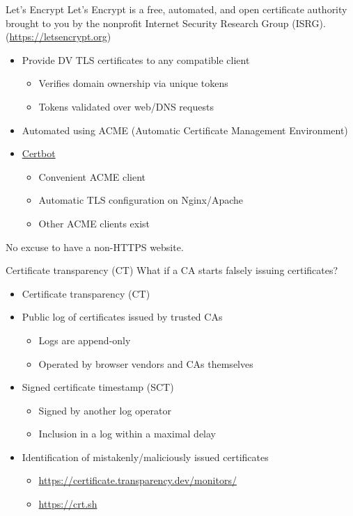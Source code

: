 \begin{frame}{Let's Encrypt}
  \pause
  Let's Encrypt is a free, automated, and open certificate authority brought to you by the nonprofit Internet Security Research Group (ISRG). ({\scriptsize\url{https://letsencrypt.org}})
  \begin{itemize}[<+(1)->]
    \item Provide DV TLS certificates to any compatible client
    \begin{itemize}
      \item Verifies domain ownership via unique tokens
      \item Tokens validated over web/DNS requests
    \end{itemize}
    \item Automated using ACME (Automatic Certificate Management Environment)
    \item \href{https://certbot.eff.org}{Certbot}
    \begin{itemize}
      \item Convenient ACME client
      \item Automatic TLS configuration on Nginx/Apache
      \item Other ACME clients exist
    \end{itemize}
  \end{itemize}

  \pause
  No excuse to have a non-HTTPS website.
\end{frame}

\begin{frame}{Certificate transparency (CT)}
  What if a CA starts falsely issuing certificates?
  \begin{itemize}[<+(1)->]
    \item Certificate transparency (CT)
    \item Public log of certificates issued by trusted CAs
    \begin{itemize}
      \item Logs are append-only
      \item Operated by browser vendors and CAs themselves
    \end{itemize}
    \item Signed certificate timestamp (SCT)
    \begin{itemize}
      \item Signed by another log operator
      \item Inclusion in a log within a maximal delay
    \end{itemize}
    \item Identification of mistakenly/maliciously issued certificates
    \begin{itemize}
      \item {\small{\url{https://certificate.transparency.dev/monitors/}}}
      \item {\small{\url{https://crt.sh}}}
    \end{itemize}
  \end{itemize}
\end{frame}

